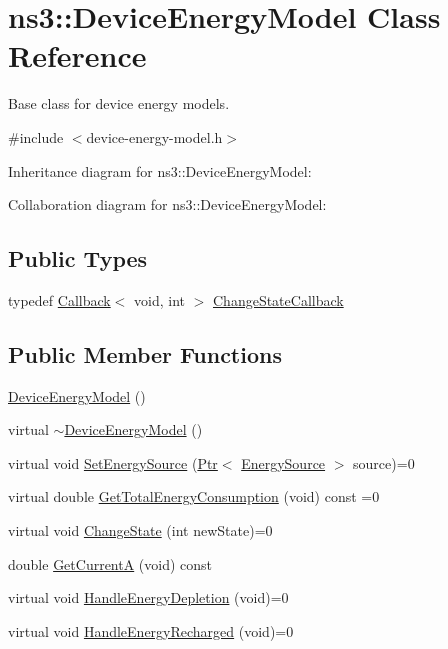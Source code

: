 \hypertarget{classns3_1_1DeviceEnergyModel}{}\section{ns3\+:\+:Device\+Energy\+Model Class Reference}
\label{classns3_1_1DeviceEnergyModel}


Base class for device energy models.  




{\ttfamily \#include $<$device-\/energy-\/model.\+h$>$}



Inheritance diagram for ns3\+:\+:Device\+Energy\+Model\+:


Collaboration diagram for ns3\+:\+:Device\+Energy\+Model\+:
\subsection*{Public Types}
\begin{DoxyCompactItemize}
\item 
typedef \hyperlink{classns3_1_1Callback}{Callback}$<$ void, int $>$ \hyperlink{classns3_1_1DeviceEnergyModel_a26632ed1b86ee8f6c7fc4c756f0027ad}{Change\+State\+Callback}
\end{DoxyCompactItemize}
\subsection*{Public Member Functions}
\begin{DoxyCompactItemize}
\item 
\hyperlink{classns3_1_1DeviceEnergyModel_a29174f25707f14465081d80b555e3589}{Device\+Energy\+Model} ()
\item 
virtual \hyperlink{classns3_1_1DeviceEnergyModel_aca610c8d87231d28c9b4a47d0c27a4c0}{$\sim$\+Device\+Energy\+Model} ()
\item 
virtual void \hyperlink{classns3_1_1DeviceEnergyModel_a2dbad6bf9ef615073885fc68c9cf6783}{Set\+Energy\+Source} (\hyperlink{classns3_1_1Ptr}{Ptr}$<$ \hyperlink{classns3_1_1EnergySource}{Energy\+Source} $>$ source)=0
\item 
virtual double \hyperlink{classns3_1_1DeviceEnergyModel_a2d791067acdc2d6298cc76aa318d6a17}{Get\+Total\+Energy\+Consumption} (void) const =0
\item 
virtual void \hyperlink{classns3_1_1DeviceEnergyModel_a332be7863f3e8258743811077dde7f39}{Change\+State} (int new\+State)=0
\item 
double \hyperlink{classns3_1_1DeviceEnergyModel_a3e18916ce280747f410846d9b4e9847c}{Get\+CurrentA} (void) const 
\item 
virtual void \hyperlink{classns3_1_1DeviceEnergyModel_a8c5d6736dc63f20edd756503edb605f7}{Handle\+Energy\+Depletion} (void)=0
\item 
virtual void \hyperlink{classns3_1_1DeviceEnergyModel_a9fb1053906abf1e8fb6dc3ae3f287046}{Handle\+Energy\+Recharged} (void)=0
\end{DoxyCompactItemize}
